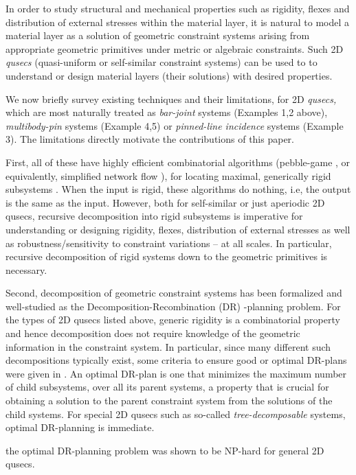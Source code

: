In order to study structural and mechanical properties such as rigidity, flexes and distribution of external stresses 
within the material layer, it is natural to model a material layer as a solution of geometric constraint systems 
arising from appropriate geometric primitives under metric or algebraic constraints. 
Such  2D {\em qusecs} (quasi-uniform or self-similar constraint systems) can be used to 
to understand or design material layers (their solutions) with desired properties.

We now briefly survey existing techniques and their limitations, for 2D {\em qusecs,} which are most naturally treated as
{\it bar-joint} systems (Examples 1,2 above), {\it multibody-pin} systems (Example 4,5) or {\it pinned-line incidence} systems (Example 3). 
The limitations directly motivate the contributions of this paper.

First, all of these have highly efficient combinatorial algorithms (pebble-game \cite{XX}, or equivalently, simplified network flow \cite{XX}), 
for locating maximal, generically rigid subsystems \cite{XX}. When the input is rigid, these algorithms do nothing, i.e, the output is the same as the input.
However, both for self-similar or just aperiodic 2D qusecs, recursive decomposition into rigid subsystems
is imperative for understanding or designing rigidity, flexes, distribution 
of external stresses as well as robustness/sensitivity to constraint variations -- at all scales. 
In particular, recursive decomposition of rigid systems down to the geometric primitives is necessary.

Second,  decomposition of geometric constraint systems has been formalized \cite{XX} and well-studied \cite{XX} 
as the Decomposition-Recombination (DR)
-planning problem.
For the types of 2D qusecs listed above, generic rigidity is 
a combinatorial property and hence decomposition does not require
knowledge of the geometric information in the constraint system. 
In particular, since many different such decompositions typically exist, 
some criteria  to ensure good or optimal DR-plans were given in \cite{XX}. An optimal DR-plan is one
that minimizes the maximum number of child subsystems, over all its parent systems, a property that is 
crucial for obtaining a solution to the parent constraint system from the solutions of the child systems.
For special 2D qusecs such as so-called {\em tree-decomposable} systems, optimal DR-planning is immediate.

the optimal DR-planning problem was shown to be NP-hard for general 2D qusecs. 

